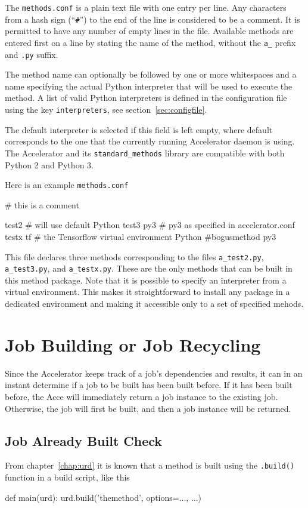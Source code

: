 The \texttt{methods.conf} is a plain text file with one entry per
line.  Any characters from a hash sign (``\texttt{\#}'') to the end of
the line is considered to be a comment.  It is permitted to have any
number of empty lines in the file.  Available methods are entered
first on a line by stating the name of the method, without the
\texttt{a\_} prefix and \texttt{.py} suffix.

The method name can optionally be followed by one or more whitespaces
and a name specifying the actual Python interpreter that will be used
to execute the method.  A list of valid Python interpreters is defined
in the configuration file using the key
\texttt{interpreters}, see section~\ref{sec:configfile}.

The default interpreter is selected if this field is left empty, where
default corresponds to the one that the currently running Accelerator
daemon is using.  The Accelerator and its \texttt{standard\_methods}
library are compatible with both Python 2 and Python 3.

Here is an example \texttt{methods.conf}
\begin{shell}
# this is a comment

test2                # will use default Python
test3           py3  # py3 as specified in accelerator.conf
testx           tf   # the Tensorflow virtual environment Python
#bogusmethod    py3
\end{shell}
This file declares three methods corresponding to the files
\texttt{a\_test2.py}, \texttt{a\_test3.py}, and \texttt{a\_testx.py}.
These are the only methods that can be built in this method package.
Note that it is possible to specify an interpreter from a virtual
environment.  This makes it straightforward to install any package in
a dedicated environment and making it accessible only to a set of
specified mehods.



\section{Job Building or Job Recycling}
Since the Accelerator keeps track of a job's dependencies and results,
it can in an instant determine if a job to be built has been built
before.  If it has been built before, the Acce will immediately return
a job instance to the existing job.  Otherwise, the job will first be
built, and then a job instance will be returned.


\subsection{Job Already Built Check}
From chapter~\ref{chap:urd} it is known that a method is built using
the \texttt{.build()} function in a build script, like this
\begin{python}
def main(urd):
    urd.build('themethod', options=..., ...)
\end{python}

